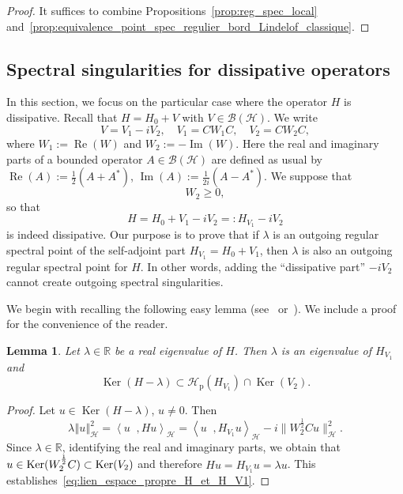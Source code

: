 \documentclass[10pt]{amsart}
\newtheorem{lemm}[theo]{Lemma}\newtheorem{prop}[theo]{Proposition}\newtheorem{coro}[theo]{Corollary}\newtheorem{conj}[theo]{Conjecture}
\theoremstyle{definition}\newtheorem{defi}[theo]{Definition}\newtheorem{rema}[theo]{Remark}\newtheorem{exam}[theo]{Example}\newtheorem{exem}[theo]{Example}\newtheorem{nota}[theo]{Notation}
\newcommand{\Hi}{\mathcal{H}}
\newcommand{\R}{\mathbb{R}}
\newcommand{\norme}[1]{\left\Vert #1\right\Vert}
\newcommand{\scal}[2]{\left\langle{#1} \middle., {#2}\right\rangle}
\newcommand{\clB}{\mathcal{B}}
\DeclareMathOperator{\Ker}{Ker}
\DeclareMathOperator{\im}{Im}
\DeclareMathOperator{\re}{Re}
\begin{document}
\begin{proof}
It suffices to combine Propositions~\ref{prop:reg_spec_local} and~\ref{prop:equivalence_point_spec_regulier_bord_Lindelof_classique}.
\end{proof}



\subsection{Spectral singularities for dissipative operators}\label{sec:dissipative case}

In this section, we focus on the particular case where the operator $H$ is dissipative. Recall that $H=H_0+V$ with $V\in\clB(\Hi)$. We write
\begin{equation*}
V = V_1 - i V_2, \quad V_1=CW_1C, \quad V_2=CW_2C,
\end{equation*}
where $W_1:=\re(W)$ and $W_2:=-\im(W)$. Here the real and imaginary parts of a bounded operator $A\in\clB(\Hi)$ are defined as usual by $\re(A):=\frac{1}{2}(A+A^*)$, $\im(A):=\frac{1}{2i}(A-A^*)$. We suppose that
\begin{equation*}
W_2\ge0,
\end{equation*}
so that
\begin{equation*}
H=H_0+V_1-iV_2=: H_{V_1}-iV_2
\end{equation*}
is indeed dissipative. Our purpose is to prove that if $\lambda$ is an outgoing regular spectral point of the self-adjoint part $H_{V_1}=H_0+V_1$, then $\lambda$ is also an outgoing regular spectral point for $H$. In other words, adding the ``dissipative part'' $-iV_2$ cannot create outgoing spectral singularities.


We begin with recalling the following easy lemma (see~\cite[Lemma~6.1]{Da80_01} or~\cite[Lemma~3.1]{FaFr18_01}). We include a proof for the convenience of the reader.

\begin{lemm}\label{lm:eigen-diss}
Let $\lambda\in\R$ be a real eigenvalue of $H$. Then $\lambda$ is an eigenvalue of $H_{V_1}$ and
\begin{equation}\label{eq:lien_espace_propre_H_et_H_V1}
\Ker(H-\lambda)\subset\mathcal{H}_\mathrm{p}(H_{V_1})\cap\Ker(V_2).
\end{equation}
\end{lemm}

\begin{proof}
Let $u\in\Ker(H-\lambda)$, $u\neq0$. Then
\begin{equation*}
\lambda\norme{u}_\Hi^2=\scal{u}{Hu}_\Hi=\scal{u}{H_{V_1}u}_\Hi-i\Big \|W_2^\frac{1}{2}Cu\Big\|_\Hi^2.
\end{equation*}
Since $\lambda\in\R$, identifying the real and imaginary parts, we obtain that $u\in\Ker(W_2^\frac{1}{2}C)\linebreak[4]\subset\Ker(V_2)$ and therefore $Hu=H_{V_1}u=\lambda u$. This establishes~\eqref{eq:lien_espace_propre_H_et_H_V1}.
\end{proof}
\end{document}
